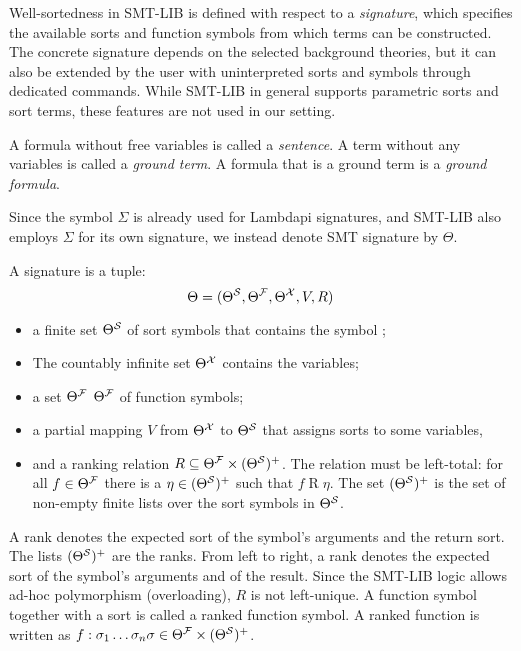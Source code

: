Well-sortedness in SMT-LIB is defined with respect to a \emph{signature}, which specifies the available sorts and function symbols from which terms can be constructed.
The concrete signature depends on the selected background theories, but it can also be extended by the user with uninterpreted sorts and symbols through dedicated commands.
While SMT-LIB in general supports parametric sorts and sort terms, these features are not used in our setting.


A formula without free variables is called a \emph{sentence}.
A term without any variables is called a \emph{ground term}. A formula that is a ground term is a \emph{ground formula}.

\begin{notation}
Since the symbol $\Sigma$ is already used for Lambdapi signatures, and SMT-LIB also employs $\Sigma$ for its own signature, we instead denote SMT signature by $\Theta$.  
\end{notation}

\begin{definition}[Signature]\label{def:smt-signature}
A signature is a tuple:
\[
    \Theta = (\Theta^\cal{S}, \Theta^\cal{F}, \Theta^\cal{X}, V, R)
\]
\begin{itemize}
    \item  a finite set $\Theta^\cal{S}$   of sort symbols that contains the symbol ;
    \item The countably infinite set $\Theta^\cal{X}$  contains the variables;
    \item a set $\Theta^\cal{F}$ $\Theta^\cal{F}$ of function symbols;
    \item a partial mapping $V$ from $\Theta^\cal{X}$ to $\Theta^\cal{S}$ that assigns sorts to some variables,
    \item and a ranking relation $R \subseteq \Theta^\cal{F} \times (\Theta^\cal{S})^+$. The relation must be left-total: for
    all $f \in \Theta^\cal{F}$ there is a $\eta \in (\Theta^\cal{S})^+$ such that $f \mathrel{R} \eta$. The set $(\Theta^\cal{S})^+$ 
    is the set of non-empty finite lists over the sort symbols in $\Theta^\cal{S}$.
\end{itemize}
\end{definition}

A rank denotes the expected sort of the symbol's arguments and the return sort. The lists $(\Theta^\cal{S})^+$ are the ranks.
From left to right, a rank denotes the expected sort of the symbol's arguments and of the result.
Since the SMT-LIB logic allows ad-hoc polymorphism (overloading), $R$ is not left-unique.
A function symbol together with a sort is called a ranked function symbol.
A ranked function is written as $f: \sigma_1\dots\sigma_n\sigma \in \Theta^{\cal{F}} \times (\Theta^{\cal{S}})^+$.

